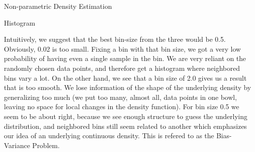 \documentclass[
ngerman,
]{tudaexercise}
\begin{document}
\begin{task}{Non-parametric Density Estimation}
\begin{subtask}{Histogram}
\begin{figure}[H]
\end{figure}
Intuitively, we suggest that the best bin-size from the three would be 0.5. Obviously, 0.02 is too small. Fixing a bin with that bin size, we got a very low probability of having even a single sample in the bin. We are very reliant on the randomly chosen data points, and therefore get a histogram where neighbored bins vary a lot. On the other hand, we see that a bin size of 2.0 gives us a result that is too smooth. We lose information of the shape of the underlying density by generalizing too much (we put too many, almost all, data points in one bowl, leaving no space for local changes in the density function). For bin size 0.5 we seem to be about right, because we see enough structure to guess the underlying distribution, and neighbored bins still seem related to another which emphasizes our idea of an underlying continuous density. This is refered to as the Bias-Variance Problem.
	\end{subtask}
\end{task}
	
\end{document}
